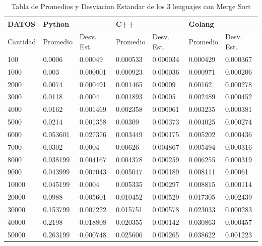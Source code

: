 \documentclass[12pt]{article} %
\begin{document}
\begin{table}[H]
    \def\arraystretch{1.3}
    \centering
    \begin{tabular}{|l|l|l|l|l|l|l|}
    \hline        
        DATOS & Python & ~ & C++ & ~ & Golang & ~ \\ \hline
        Cantidad & Promedio & Desv. Est. & Promedio & Desv. Est. & Promedio & Desv. Est. \\ \hline
        100 & 0.0006 & 0.00049 & 0.000533 & 0.000034 & 0.000429 & 0.000367 \\ \hline
        1000 & 0.003 & 0.000001 & 0.000923 & 0.000036 & 0.000971 & 0.000206 \\ \hline
        2000 & 0.0074 & 0.000491 & 0.001465 & 0.00009 & 0.00162 & 0.000278 \\ \hline
        3000 & 0.0118 & 0.0004 & 0.001893 & 0.00005 & 0.002489 & 0.000452 \\ \hline
        4000 & 0.0162 & 0.001469 & 0.002358 & 0.000061 & 0.003235 & 0.000381 \\ \hline
        5000 & 0.0214 & 0.001358 & 0.00309 & 0.000373 & 0.004025 & 0.000274 \\ \hline
        6000 & 0.053601 & 0.027376 & 0.003449 & 0.000175 & 0.005202 & 0.000436 \\ \hline
        7000 & 0.0302 & 0.0004 & 0.00626 & 0.004867 & 0.005494 & 0.000316 \\ \hline
        8000 & 0.038199 & 0.004167 & 0.004378 & 0.000259 & 0.006255 & 0.000319 \\ \hline
        9000 & 0.043999 & 0.007043 & 0.005047 & 0.000189 & 0.008111 & 0.00061 \\ \hline
        10000 & 0.045199 & 0.0004 & 0.005335 & 0.000297 & 0.008815 & 0.000114 \\ \hline
        20000 & 0.0988 & 0.005601 & 0.010452 & 0.000529 & 0.017305 & 0.002439 \\ \hline
        30000 & 0.153799 & 0.007222 & 0.015751 & 0.000578 & 0.023033 & 0.000283 \\ \hline
        40000 & 0.2198 & 0.018808 & 0.020355 & 0.000142 & 0.030863 & 0.000457 \\ \hline
        50000 & 0.263199 & 0.000748 & 0.025606 & 0.000265 & 0.038622 & 0.001223 \\ \hline
    \end{tabular}
    \caption{Tabla de Promedios y Desviacion Estandar de los 3 lenguajes con Merge Sort}
\end{table}

\vspace{6cm}
\end{document}
